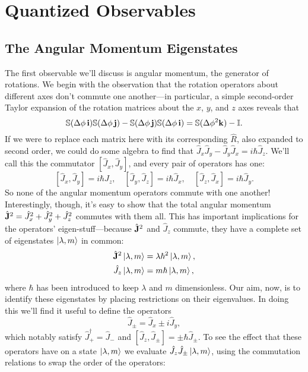 \documentclass[../p116main.tex]{subfiles}
\begin{document}

\chapter{Quantized Observables}
\section{The Angular Momentum Eigenstates}
The first observable we'll discuss is angular momentum, the generator of rotations.
We begin with the observation that the rotation operators about different axes don't commute one another---in particular, a simple second-order Taylor expansion of the rotation matrices about the $x$, $y$, and $z$ axes reveals that
\[ \mathbb S (\Delta \phi \, \mathbf{i}) \mathbb S (\Delta \phi \, \mathbf{j}) - \mathbb S (\Delta \phi \, \mathbf{j}) \mathbb S (\Delta \phi \, \mathbf{i}) = \mathbb S (\Delta \phi^2 \mathbf{k}) - \mathbb I. \]
If we were to replace each matrix here with its corresponding $\hat R$, also expanded to second order, we could do some algebra to find that $\hat J_x \hat J_y - \hat J_y \hat J_x = i\hbar \hat J_z$.
We'll call this the commutator $[\hat J_x, \hat J_y]$, and every pair of operators has one:
\[ [\hat J_x, \hat J_y] = i\hbar \hat J_z, \quad [\hat J_y, \hat J_z] = i\hbar \hat J_x, \quad [\hat J_z, \hat J_x] = i\hbar \hat J_y. \]
So none of the angular momentum operators commute with one another!
Interestingly, though, it's easy to show that the total angular momentum $\hat{\mathbf{J}}^2 = \hat J_x^2 + \hat J_y^2 + \hat J_z^2$ commutes with them all.
This has important implications for the operators' eigen-stuff---because $\hat{\mathbf{J}}^2$ and $\hat J_z$ commute, they have a complete set of eigenstates $\left| \lambda, m \right>$ in common: \vspace{-10pt}
\begin{align*}
    \hat{\mathbf{J}}^2 \left| \lambda, m \right> &= \lambda \hbar^2 \left| \lambda, m \right>, \\
    \hat J_z \left| \lambda, m \right> &= m \hbar \left| \lambda, m \right>,
\end{align*}
where $\hbar$ has been introduced to keep $\lambda$ and $m$ dimensionless.
Our aim, now, is to identify these eigenstates by placing restrictions on their eigenvalues.
In doing this we'll find it useful to define the operators
\[ \hat J_\pm = \hat J_x \pm i \hat J_y, \]
which notably satisfy $\hat J_+^\dagger = \hat J_-$ and $[\hat J_z, \hat J_\pm] = \pm \hbar \hat J_\pm$.
To see the effect that these operators have on a state $\left| \lambda, m \right>$ we evaluate $\hat J_z \hat J_\pm \left| \lambda, m \right>$, using the commutation relations to swap the order of the operators:
\end{document}
